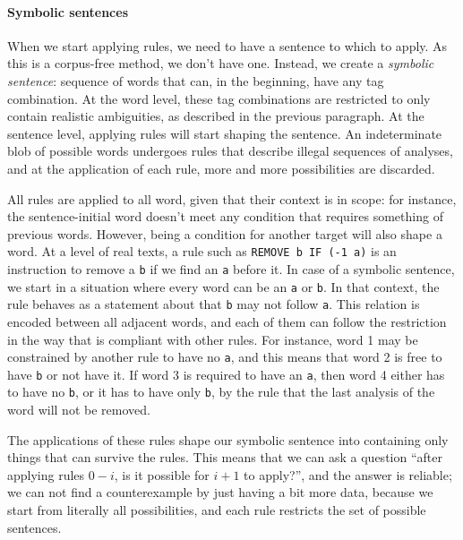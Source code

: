 
\paragraph{Symbolic sentences}

When we start applying rules, we need to have a sentence to which to apply.
As this is a corpus-free method, we don't have one.
Instead, we create a \emph{symbolic sentence}: sequence of words that can, in the beginning, have any tag combination.
At the word level, these tag combinations are restricted to only contain realistic ambiguities, as described in the previous paragraph.
At the sentence level, applying rules will start shaping the sentence.
An indeterminate blob of possible words undergoes rules that describe illegal sequences of analyses,
and at the application of each rule, more and more possibilities are discarded.

All rules are applied to all word, given that their context is in scope: for instance, the sentence-initial word doesn't meet any condition that requires something of previous words.
However, being a condition for another target will also shape a word.
At a level of real texts, a rule such as \texttt{REMOVE b IF (-1 a)} is an instruction to remove a \texttt{b} if we find an \texttt{a} before it.
In case of a symbolic sentence, we start in a situation where every word can be an \texttt{a} or \texttt{b}. In that context, the rule behaves as a statement about that \texttt{b} may not follow \texttt{a}. This relation is encoded between all adjacent words, and each of them can follow the restriction in the way that is compliant with other rules.
For instance, word 1 may be constrained by another rule to have no \texttt{a}, and this means that word 2 is free to have \texttt{b} or not have it. If word 3 is required to have an  \texttt{a}, then word 4 either has to have no \texttt{b}, or it has to have only \texttt{b}, by the rule that the last analysis of the word will not be removed.

The applications of these rules shape our symbolic sentence into containing only things that can survive the rules. This means that we can ask a question ``after applying rules $0-i$, is it possible for $i+1$ to apply?'', and the answer is reliable; we can not find a counterexample by just having a bit more data, because we start from literally all possibilities, and each rule
restricts the set of possible sentences.

